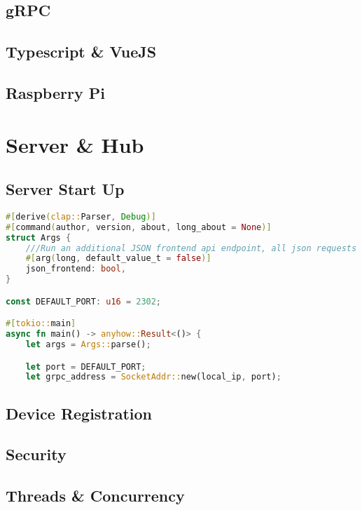 \subsection{gRPC} \label{sec:chap3:technology:grpc}
\subsection{Typescript \& VueJS} \label{sec:chap3:technology:ts}
\subsection{Raspberry Pi} \label{sec:chap3:technology:raspi}


\section{Server \& Hub} \label{sec:chap3:server}
\subsection{Server Start Up} \label{sec:chap3:server:startup}
\begin{lstlisting}[language=Rust, style=boxed]
#[derive(clap::Parser, Debug)]
#[command(author, version, about, long_about = None)]
struct Args {
    ///Run an additional JSON frontend api endpoint, all json requests get routed to main GRPC
    #[arg(long, default_value_t = false)]
    json_frontend: bool,
}

const DEFAULT_PORT: u16 = 2302;

#[tokio::main]
async fn main() -> anyhow::Result<()> {
    let args = Args::parse();

    let port = DEFAULT_PORT;
    let grpc_address = SocketAddr::new(local_ip, port);
\end{lstlisting}
\subsection{Device Registration} \label{sec:chap3:server:registration}


\subsection{Security} \label{sec:chap3:server:security}

\subsection{Threads \& Concurrency} \label{sec:chap3:server:threads}

